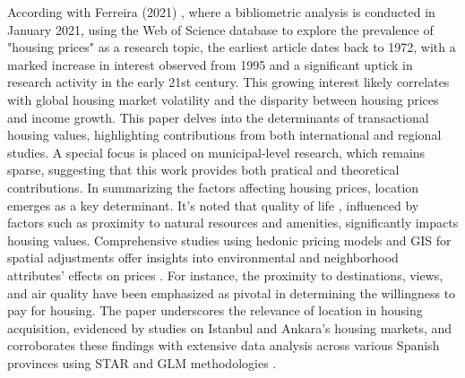 \documentclass{aip-cp}
\begin{document}
According with Ferreira (2021) \cite{ferreira2021dinamica}, where a bibliometric analysis is conducted in January 2021, using the Web of Science database to explore the prevalence of "housing prices" as a research topic, the earliest article dates back to 1972, with a marked increase in interest observed from 1995 and a significant uptick in research activity in the early 21st century. This growing interest likely correlates with global housing market volatility and the disparity between housing prices and income growth.
This paper delves into the determinants of transactional housing values, highlighting contributions from both international and regional studies. A special focus is placed on municipal-level research, which remains sparse, suggesting that this work provides both pratical and theoretical contributions.
In summarizing the factors affecting housing prices, location \cite{adair1996hedonic} emerges as a key determinant. It's noted that quality of life  \cite{calmasur2016determining}, influenced by factors such as proximity to natural resources and amenities, significantly impacts housing values. Comprehensive studies using hedonic pricing models and GIS for spatial adjustments offer insights into environmental and neighborhood attributes' effects on prices \cite{adair1996hedonic}. For instance, the proximity to destinations, views, and air quality  \cite{calmasur2016determining} have been emphasized as pivotal in determining the willingness to pay for housing. The paper underscores the relevance of location in housing acquisition, evidenced by studies on Istanbul and Ankara's  \cite{alkana2015housing} housing markets, and corroborates these findings with extensive data analysis across various Spanish provinces using STAR and GLM methodologies  \cite{mcgreal2013implicit}.
\end{document}
